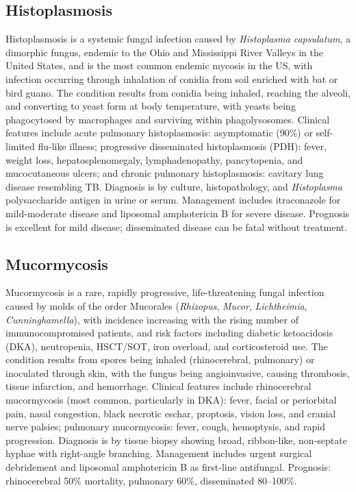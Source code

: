 \subsection{Histoplasmosis}
\label{sec:Histoplasmosis}
Histoplasmosis is a systemic fungal infection caused by \textit{Histoplasma capsulatum}, a dimorphic fungus, endemic to the Ohio and Mississippi River Valleys in the United States, and is the most common endemic mycosis in the US, with infection occurring through inhalation of conidia from soil enriched with bat or bird guano. The condition results from conidia being inhaled, reaching the alveoli, and converting to yeast form at body temperature, with yeasts being phagocytosed by macrophages and surviving within phagolysosomes. Clinical features include acute pulmonary histoplasmosis: asymptomatic (90\%) or self-limited flu-like illness; progressive disseminated histoplasmosis (PDH): fever, weight loss, hepatosplenomegaly, lymphadenopathy, pancytopenia, and mucocutaneous ulcers; and chronic pulmonary histoplasmosis: cavitary lung disease resembling TB. Diagnosis is by culture, histopathology, and \textit{Histoplasma} polysaccharide antigen in urine or serum. Management includes itraconazole for mild-moderate disease and liposomal amphotericin B for severe disease. Prognosis is excellent for mild disease; disseminated disease can be fatal without treatment.

\subsection{Mucormycosis}
\label{sec:Mucormycosis}
Mucormycosis is a rare, rapidly progressive, life-threatening fungal infection caused by molds of the order Mucorales (\textit{Rhizopus}, \textit{Mucor}, \textit{Lichtheimia}, \textit{Cunninghamella}), with incidence increasing with the rising number of immunocompromised patients, and risk factors including diabetic ketoacidosis (DKA), neutropenia, HSCT/SOT, iron overload, and corticosteroid use. The condition results from spores being inhaled (rhinocerebral, pulmonary) or inoculated through skin, with the fungus being angioinvasive, causing thrombosis, tissue infarction, and hemorrhage. Clinical features include rhinocerebral mucormycosis (most common, particularly in DKA): fever, facial or periorbital pain, nasal congestion, black necrotic eschar, proptosis, vision loss, and cranial nerve palsies; pulmonary mucormycosis: fever, cough, hemoptysis, and rapid progression. Diagnosis is by tissue biopsy showing broad, ribbon-like, non-septate hyphae with right-angle branching. Management includes urgent surgical debridement and liposomal amphotericin B as first-line antifungal. Prognosis: rhinocerebral 50\% mortality, pulmonary 60\%, disseminated 80--100\%.

